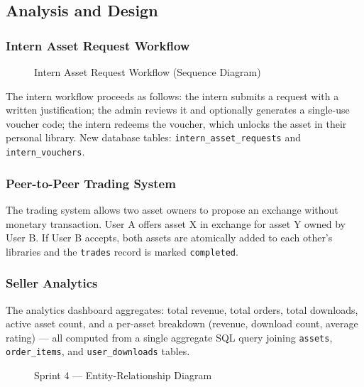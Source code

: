 \subsection{Analysis and Design}

\subsubsection{Intern Asset Request Workflow}

\begin{figure}[H]
\centering
\resizebox{\textwidth}{!}{}
\caption{Intern Asset Request Workflow (Sequence Diagram)}
\label{fig:sprint4_intern_flow}
\end{figure}

The intern workflow proceeds as follows: the intern submits a request with a written justification; the admin reviews it and optionally generates a single-use voucher code; the intern redeems the voucher, which unlocks the asset in their personal library. New database tables: \texttt{intern\_asset\_requests} and \texttt{intern\_vouchers}.

\subsubsection{Peer-to-Peer Trading System}

The trading system allows two asset owners to propose an exchange without monetary transaction. User A offers asset X in exchange for asset Y owned by User B. If User B accepts, both assets are atomically added to each other's libraries and the \texttt{trades} record is marked \texttt{completed}.

\subsubsection{Seller Analytics}

The analytics dashboard aggregates: total revenue, total orders, total downloads, active asset count, and a per-asset breakdown (revenue, download count, average rating) — all computed from a single aggregate SQL query joining \texttt{assets}, \texttt{order\_items}, and \texttt{user\_downloads} tables.

\begin{figure}[H]
\centering
\resizebox{\textwidth}{!}{}
\caption{Sprint 4 --- Entity-Relationship Diagram}
\label{fig:sprint4_erd}
\end{figure}

